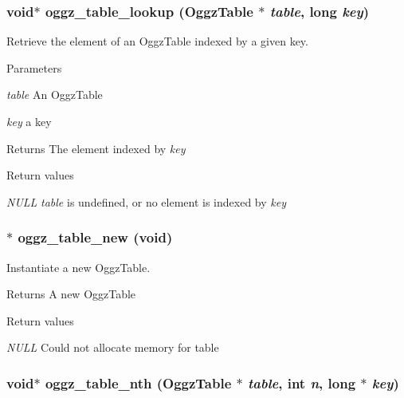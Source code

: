 \subsubsection[{oggz\_\-table\_\-lookup}]{\setlength{\rightskip}{0pt plus 5cm}void$\ast$ oggz\_\-table\_\-lookup ({\bf OggzTable} $\ast$ {\em table}, \/  long {\em key})}\label{oggz__table_8h_a92ea55bffd5657be29cf1972f33364e3}


Retrieve the element of an OggzTable indexed by a given key. 


\begin{DoxyParams}{Parameters}
\item[{\em table}]An OggzTable \item[{\em key}]a key \end{DoxyParams}
\begin{DoxyReturn}{Returns}
The element indexed by {\itshape key\/} 
\end{DoxyReturn}

\begin{DoxyRetVals}{Return values}
\item[{\em NULL}]{\itshape table\/} is undefined, or no element is indexed by {\itshape key\/} \end{DoxyRetVals}
\subsubsection[{oggz\_\-table\_\-new}]{$\ast$ oggz\_\-table\_\-new (void)}\label{oggz__table_8h_a40772505443484de93526882c48f0dd8}


Instantiate a new OggzTable. 

\begin{DoxyReturn}{Returns}
A new OggzTable 
\end{DoxyReturn}

\begin{DoxyRetVals}{Return values}
\item[{\em NULL}]Could not allocate memory for table \end{DoxyRetVals}
\subsubsection[{oggz\_\-table\_\-nth}]{\setlength{\rightskip}{0pt plus 5cm}void$\ast$ oggz\_\-table\_\-nth ({\bf OggzTable} $\ast$ {\em table}, \/  int {\em n}, \/  long $\ast$ {\em key})}\label{oggz__table_8h_a285c3cbdb46e9b8c2a831728182856f1}


